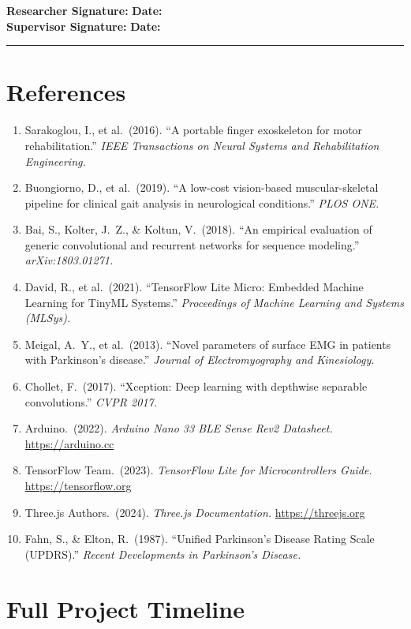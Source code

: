 \documentclass[12pt,a4paper]{article}
\newcommand{\sigblock}{%
  \vspace{0.6em}
  \noindent\textbf{Researcher Signature:} \underline{\hspace{6cm}} \quad \textbf{Date:} \underline{\hspace{3cm}}\\[0.4em]
  \noindent\textbf{Supervisor Signature:} \underline{\hspace{6cm}} \quad \textbf{Date:} \underline{\hspace{3cm}}
  \vspace{0.4em}\hrule\vspace{0.6em}
}
\begin{document}
\sigblock

\section{References}

\begin{enumerate}
  \item Sarakoglou, I., et al.\ (2016). ``A portable finger exoskeleton for motor rehabilitation.'' \textit{IEEE Transactions on Neural Systems and Rehabilitation Engineering.}
  \item Buongiorno, D., et al.\ (2019). ``A low-cost vision-based muscular-skeletal pipeline for clinical gait analysis in neurological conditions.'' \textit{PLOS ONE.}
  \item Bai, S., Kolter, J.\ Z., \& Koltun, V.\ (2018). ``An empirical evaluation of generic convolutional and recurrent networks for sequence modeling.'' \textit{arXiv:1803.01271.}
  \item David, R., et al.\ (2021). ``TensorFlow Lite Micro: Embedded Machine Learning for TinyML Systems.'' \textit{Proceedings of Machine Learning and Systems (MLSys).}
  \item Meigal, A.\ Y., et al.\ (2013). ``Novel parameters of surface EMG in patients with Parkinson's disease.'' \textit{Journal of Electromyography and Kinesiology.}
  \item Chollet, F.\ (2017). ``Xception: Deep learning with depthwise separable convolutions.'' \textit{CVPR 2017.}
  \item Arduino.\ (2022). \textit{Arduino Nano 33 BLE Sense Rev2 Datasheet.} \url{https://arduino.cc}
  \item TensorFlow Team.\ (2023). \textit{TensorFlow Lite for Microcontrollers Guide.} \url{https://tensorflow.org}
  \item Three.js Authors.\ (2024). \textit{Three.js Documentation.} \url{https://threejs.org}
  \item Fahn, S., \& Elton, R.\ (1987). ``Unified Parkinson's Disease Rating Scale (UPDRS).'' \textit{Recent Developments in Parkinson's Disease.}
\end{enumerate}

\section{Full Project Timeline}
\end{document}
